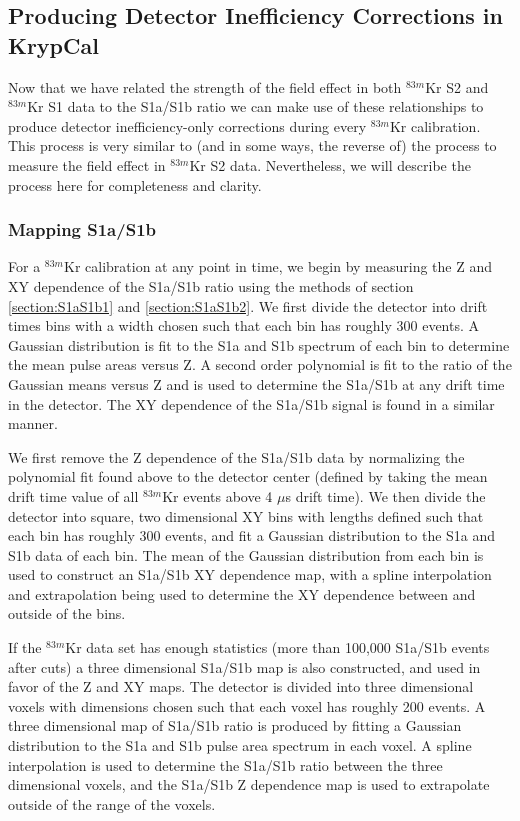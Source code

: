 \subsection{Producing Detector Inefficiency Corrections in KrypCal} \label{KrypCalCode}

Now that we have related the strength of the field effect in both $^{83m}$Kr S2 and $^{83m}$Kr S1 data to the S1a/S1b ratio we can make use of these relationships to produce detector inefficiency-only corrections during every $^{83m}$Kr calibration.  This process is very similar to (and in some ways, the reverse of) the process to measure the field effect in $^{83m}$Kr S2 data. Nevertheless, we will describe the process here for completeness and clarity.

\subsubsection{Mapping S1a/S1b}

For a $^{83m}$Kr calibration at any point in time, we begin by measuring the Z and XY dependence of the S1a/S1b ratio using the methods of section  \ref{section:S1aS1b1} and  \ref{section:S1aS1b2}.  We first divide the detector into drift times bins with a width chosen such that each bin has roughly 300 events.   A Gaussian distribution is fit to the S1a and S1b spectrum of each bin to determine the mean pulse areas versus Z.  A second order polynomial is fit to the ratio of the Gaussian means versus Z and is used to determine the S1a/S1b at any drift time in the detector.  The XY dependence of the S1a/S1b signal is found in a similar manner.  

We first remove the Z dependence of the S1a/S1b data by normalizing the polynomial fit found above to the detector center (defined by taking the mean drift time value of all $^{83m}$Kr events above 4 $\mu$s drift time). We then divide the detector into square, two dimensional XY bins with lengths defined such that each bin has roughly 300 events, and fit a Gaussian distribution to the S1a and S1b data of each bin.  The mean of the Gaussian distribution from each bin is used to construct an S1a/S1b XY dependence map, with a spline interpolation and extrapolation being used to determine the XY dependence between and outside of the bins.  

If the $^{83m}$Kr data set has enough statistics (more than 100,000 S1a/S1b events after cuts) a three dimensional S1a/S1b map is also constructed, and used in favor of the Z and XY maps. The detector is divided into three dimensional voxels with dimensions chosen such that each voxel has roughly 200 events.  A three dimensional map of S1a/S1b ratio is produced by fitting a Gaussian distribution to the S1a and S1b pulse area spectrum in each voxel.  A spline interpolation is used to determine the S1a/S1b ratio between the three dimensional voxels, and the S1a/S1b Z dependence map is used to extrapolate outside of the range of the voxels. 

